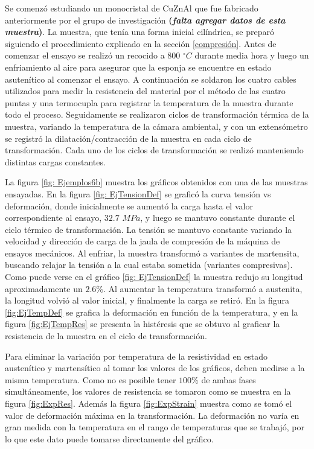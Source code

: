 \documentclass[a4paper,12pt,fleqn,twoside,openany]{book}
\begin{document}
Se comenzó estudiando un monocristal de CuZnAl que fue fabricado anteriormente por el grupo de investigación \textbf{(\textit{falta agregar datos de esta muestra})}. La muestra, que tenía una forma inicial cilíndrica, se preparó siguiendo el procedimiento explicado en la sección \ref{compresión}. Antes de comenzar el ensayo se realizó un recocido a $800$ $ ^\circ C$ durante media hora y luego un enfriamiento al aire para asegurar que la esponja se encuentre en estado asutenítico al comenzar el ensayo. A continuación se soldaron los cuatro cables utilizados para medir la resistencia del material por el método de las cuatro puntas y una termocupla para registrar la temperatura de la muestra durante todo el proceso. Seguidamente se realizaron ciclos de transformación térmica de la muestra, variando la temperatura de la cámara ambiental, y con un extensómetro se registró la dilatación/contracción de la muestra en cada ciclo de transformación. Cada uno de los ciclos de transformación se realizó manteniendo distintas cargas constantes. 

La figura \ref{fig: Ejemplos6b} muestra los gráficos obtenidos con una de las muestras ensayadas. En la figura \ref{fig: EjTensionDef} se graficó la curva tensión vs deformación, donde inicialmente se aumentó la carga hasta el valor correspondiente al ensayo, $32.7$ $MPa$, y luego se mantuvo constante durante el ciclo térmico de transformación. La tensión se mantuvo constante variando la velocidad y dirección de carga de la jaula de compresión de la máquina de ensayos mecánicos. Al enfriar, la muestra transformó a variantes de martensita, buscando relajar la tensión a la cual estaba sometida (variantes compresivas). Como puede verse en el gráfico \ref{fig: EjTensionDef} la muestra redujo su longitud aproximadamente un $2.6\%$. Al aumentar la temperatura transformó a austenita, la longitud volvió al valor inicial, y finalmente la carga se retiró. En la figura \ref{fig:EjTempDef} se grafica la deformación en función de la temperatura, y en la figura \ref{fig:EjTempRes} se presenta la histéresis que se obtuvo al graficar la resistencia de la muestra en el ciclo de transformación. 




Para eliminar la variación por temperatura de la resistividad en estado austenítico y martensítico al tomar los valores de los gráficos, deben medirse a la misma temperatura. Como no es posible tener $100 \%$ de ambas fases simultáneamente, los valores de resistencia se tomaron como se muestra en la figura \ref{fig:ExpRes}. Además la figura \ref{fig:ExpStrain} muestra como se tomó el valor de deformación máxima en la transformación. La deformación no varía en gran medida con la temperatura en el rango de temperaturas que se trabajó, por lo que este dato puede tomarse directamente del gráfico.
\end{document}
